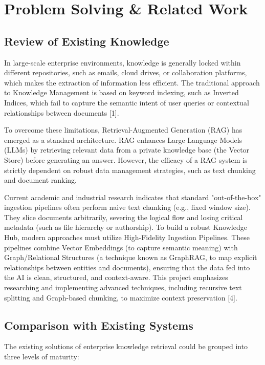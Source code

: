 \documentclass[12pt]{article}
\begin{document}
\newpage
\section{Problem Solving \& Related Work}

\subsection{Review of Existing Knowledge}
In large-scale enterprise environments, knowledge is generally locked within different repositories, such as emails, cloud drives, or collaboration platforms, which makes the extraction of information less efficient. The traditional approach to Knowledge Management is based on keyword indexing, such as Inverted Indices, which fail to capture the semantic intent of user queries or contextual relationships between documents [1].

To overcome these limitations, Retrieval-Augmented Generation (RAG) has emerged as a standard architecture. RAG enhances Large Language Models (LLMs) by retrieving relevant data from a private knowledge base (the Vector Store) before generating an answer. However, the efficacy of a RAG system is strictly dependent on robust data management strategies, such as text chunking and document ranking.

Current academic and industrial research indicates that standard "out-of-the-box" ingestion pipelines often perform naive text chunking (e.g., fixed window size). They slice documents arbitrarily, severing the logical flow and losing critical metadata (such as file hierarchy or authorship). To build a robust Knowledge Hub, modern approaches must utilize High-Fidelity Ingestion Pipelines. These pipelines combine Vector Embeddings (to capture semantic meaning) with Graph/Relational Structures (a technique known as GraphRAG, to map explicit relationships between entities and documents), ensuring that the data fed into the AI is clean, structured, and context-aware. This project emphasizes researching and implementing advanced techniques, including recursive text splitting and Graph-based chunking, to maximize context preservation [4].

\subsection{Comparison with Existing Systems}
The existing solutions of enterprise knowledge retrieval could be grouped into three levels of maturity:
\end{document}
